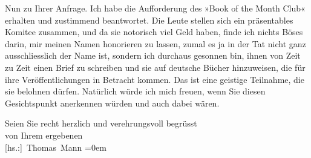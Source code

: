 \pstart
           Nun zu Ihrer Anfrage. Ich habe die Aufforderung des »Book of the Month Club« erhalten und zustimmend beantwortet. Die Leute
               stellen sich ein präsentables Komitee zusammen, und da sie notorisch viel Geld haben,
               finde ich nichts Böses darin, mir meinen Namen honorieren zu lassen, zumal es ja in
               der Tat nicht ganz ausschliesslich der Name ist, sondern ich durchaus gesonnen bin,
               ihnen von Zeit zu Zeit einen Brief zu schreiben und sie auf deutsche Bücher
               hinzuweisen, die für ihre Veröffentlichungen in Betracht kommen. Das ist eine
               geistige Teilnahme, die sie belohnen {\pb}dürfen. Natürlich würde ich mich freuen, wenn Sie diesen Gesichtspunkt anerkennen
               würden und auch dabei wären.\pend
           
\pstart
           Seien Sie recht herzlich und verehrungsvoll begrüsst{\\[\baselineskip]} von Ihrem ergebenen{\\[\baselineskip]}\spacefill\mbox{{[}hs.:{]} Thomas Mann}\pend
           \leftskip=0em{}\endnumbering{}  
      